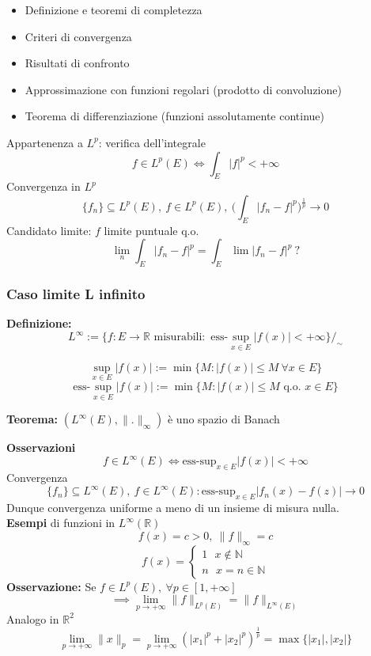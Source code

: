 \documentclass[a4paper]{article}
\newcommand{\R}{\mathbb{R}}
\newcommand{\N}{\mathbb{N}}
\begin{document}
\begin{itemize}
	\item Definizione e teoremi di completezza
	\item Criteri di convergenza
	\item Risultati di confronto
	\item Approssimazione con funzioni regolari (prodotto di convoluzione)
	\item Teorema di differenziazione (funzioni assolutamente continue)
\end{itemize}
Appartenenza a $L^p$: verifica dell'integrale
\[f\in L^p(E) \iff \int_{E}^{} |f|^p<+\infty\]
Convergenza in $L^p$
\[\{f_n\} \subseteq L^p(E),\ f\in L^p(E),\  \bigg(\int_{E}^{} |f_n-f|^p\bigg)^{\frac{1}{p}}\to 0\]
Candidato limite: $f$ limite puntuale q.o.
\[\lim_n \int_E|f_n-f|^p=\int_{E}^{} \lim |f_n-f|^p \ ?\] 
\subsubsection{Caso limite L infinito}
\begin{tcolorbox}
	\textbf{Definizione:} \[L^\infty:=\{f:E\to \R\text{ misurabili}:\text{ ess-}\sup_{x\in E}|f(x)|<+\infty\}/_\sim \]

\end{tcolorbox}	
\[\sup_{x\in E}|f(x)|:=\min \{M:|f(x)|\le M\ \forall x\in E\}\]
\[\text{ess-}\sup_{x\in E}|f(x)|:=\min \{M:|f(x)|\le M\text{ q.o. } x\in E\}\]
\begin{tcolorbox}
	\textbf{Teorema:} $(L^\infty(E),\|.\|_{\infty})$ è uno spazio di Banach
\end{tcolorbox}
\textbf{Osservazioni} 
\[f\in L^\infty(E) \iff\text{ess-sup}_{x\in E}|f(x)|<+\infty\]
Convergenza
\[\{f_n\} \subseteq L^\infty(E),\ f\in L^\infty(E): \text{ess-sup}_{x\in E}|f_n(x)-f(z)|\to 0\]
Dunque convergenza uniforme a meno di un insieme di misura nulla.
\\\textbf{Esempi} di funzioni in $L^\infty(\R)$
\[f(x)=c>0,\ \|f\|_\infty=c\]
\[f(x)=\begin{cases}
	1\ \ \ x\not\in \N
	\\n\ \ \ x=n\in \N
\end{cases}
\]
\textbf{Osservazione:} Se $f\in L^p(E),\ \forall p\in[1,+\infty]$
\[\implies \lim_{p \to +\infty} \|f\|_{L^p(E)}=\|f\|_{L^\infty(E)}\]
Analogo in $\R^2$
\[\lim_{p \to +\infty} \|x\|_p=\lim_{p \to +\infty} (|x_1|^p+|x_2|^p)^{\frac{1}{p}}=\max \{|x_1|,|x_2|\}\] 
\end{document}
